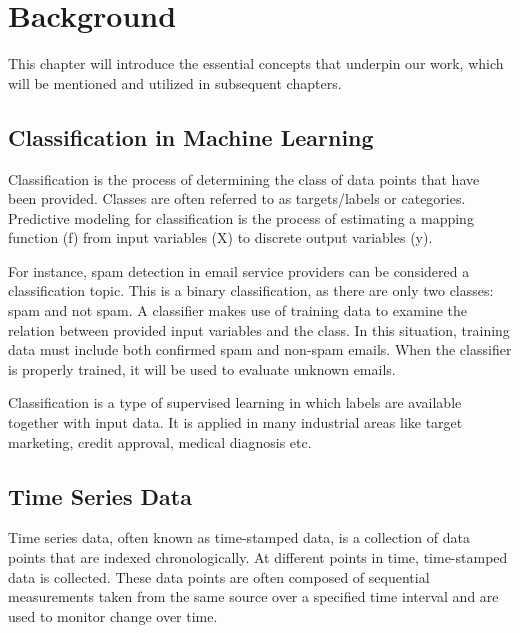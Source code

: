 \chapter{Background}
\label{chapter:background}

This chapter will introduce the essential concepts that underpin our work, which will be mentioned and utilized in subsequent chapters. 

\section{Classification in Machine Learning}

Classification is the process of determining the class of data points that have been provided. Classes are often referred to as targets/labels or categories. Predictive modeling for classification is the process of estimating a mapping function (f) from input variables (X) to discrete output variables (y). 

For instance, spam detection in email service providers can be considered a classification topic. This is a binary classification, as there are only two classes: spam and not spam. A classifier makes use of training data to examine the relation between provided input variables and the class. In this situation, training data must include both confirmed spam and non-spam emails. When the classifier is properly trained, it will be used to evaluate unknown emails. 

Classification is a type of supervised learning in which labels are available together with input data. It is applied in many industrial areas like target marketing, credit approval, medical diagnosis etc.

\section{Time Series Data}

Time series data, often known as time-stamped data, is a collection of data points that are indexed chronologically. At different points in time, time-stamped data is collected. These data points are often composed of sequential measurements taken from the same source over a specified time interval and are used to monitor change over time. 

